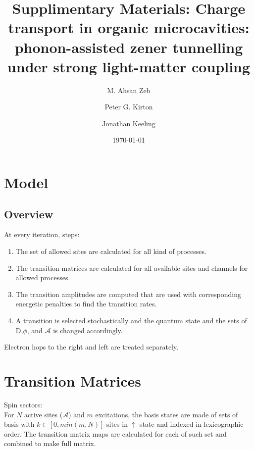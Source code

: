 \documentclass[a4paper]{revtex4-1} %
\newcommand{\ua}{\uparrow}
\begin{document}
\title{Supplimentary Materials: Charge transport in organic microcavities: phonon-assisted zener tunnelling under strong light-matter coupling}

\author{M. Ahsan Zeb}
\author{Peter G. Kirton}
\author{Jonathan Keeling}
\date{\today}

\begin{abstract}
\end{abstract}

\section{Model}


\subsection{Overview}
At every iteration, steps:\\
\begin{enumerate}
\item 
The set of allowed sites are calculated for all kind of processes.
\item
The transition matrices are calculated for all available sites and channels for allowed processes.
\item
 The transition amplitudes are computed that are used with corresponding energetic penalties 
to find the transition rates.
\item A transition is selected stochastically and the quantum state and the sets of D,$\phi$, and $\mathcal{A}$ is changed accordingly.
\end{enumerate}

Electron hops to the right and left are treated separately.


\section{Transition Matrices}
Spin sectors:\\
For $N$ active sites ($\mathcal{A}$) and $m$ excitations,
the basis states are made of sets of basis with $k\in [0,min(m,N)]$ sites in $\ua$ state
and indexed in lexicographic order.
The transition matrix maps are calculated for each of such set and combined to make full matrix.
\end{document}
